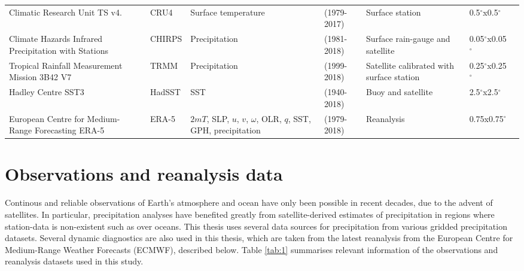 \begin{sidewaystable}
\begin{tabular}{p{5cm}|p{1.47cm}p{3.45cm}p{2.12cm}p{4.2cm}p{2.12cm}p{3.54cm}}
Climatic Research Unit TS  v4.     & CRU4         & Surface temperature  & (1979-2017)       &  Surface station    &  0.5$^\circ$x0.5$^\circ$   &        \citep{harris2014}                            \\
  Climate Hazards Infrared Precipitation with Stations   & CHIRPS          & Precipitation       & (1981-2018)       &  Surface rain-gauge and satellite               &  0.05$^\circ$x0.05$^\circ$ & \citep{funk2015}              \\
Tropical Rainfall Measurement Mission 3B42 V7       & TRMM          & Precipitation       & (1999-2018)   & Satellite calibrated with surface station   & 0.25$^\circ$x0.25$^\circ$  &  \citep{mission2011} \\
Hadley Centre SST3                           & HadSST          & SST               & (1940-2018)   & Buoy and satellite              & 2.5$^\circ$x2.5$^\circ$  &  \citep{kennedy2011} \\
European Centre for Medium-Range Forecasting ERA-5                            & ERA-5             & $2mT$, SLP, $u$, $v$, $\omega$, OLR, $q$, SST, GPH, precipitation    &  (1979-2018)    &  Reanalysis       & 0.75x0.75$^\circ$ &  \citep{era5,era5hersbach}
\end{tabular}

\end{sidewaystable}

\section{Observations and reanalysis data} \label{sq:obsdata}
Continous and reliable observations of Earth's  atmosphere and ocean have only been possible in recent decades, due to the advent of satellites. In particular, precipitation analyses have benefited greatly from satellite-derived estimates of precipitation in regions where station-data is non-existent such as over oceans.  %
This thesis uses several data sources for precipitation from various gridded precipitation datasets. 
Several dynamic diagnostics are also used in this thesis, which are taken from the latest reanalysis from the European Centre for Medium-Range Weather Forecasts (ECMWF), described below. 
Table \ref{tab:1} summarises relevant information of the observations and reanalysis datasets used in this study.
 

